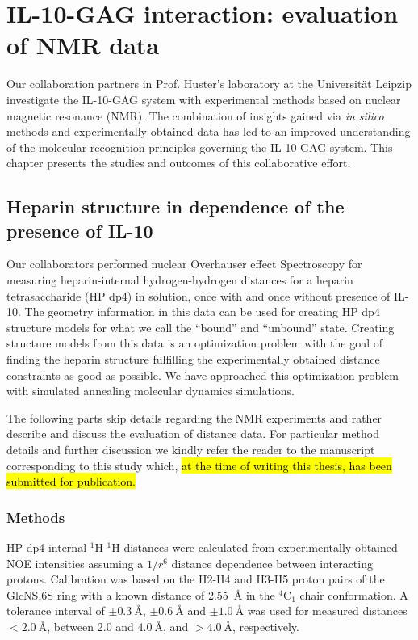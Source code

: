 \chapter{IL-10-GAG interaction: evaluation of NMR data}

Our collaboration partners in Prof. Huster's laboratory at the Universität
Leipzip investigate the IL-10-GAG system with experimental methods based on
nuclear magnetic resonance (NMR). The combination of insights gained via
\textit{in silico} methods and experimentally obtained data has led to an
improved understanding of the molecular recognition principles governing the
IL-10-GAG system. This chapter presents the studies and outcomes of this
collaborative effort.


\section{Heparin structure in dependence of the presence of IL-10}

Our collaborators performed nuclear Overhauser effect Spectroscopy for measuring
heparin-internal hydrogen-hydrogen distances for a heparin tetrasaccharide (HP
dp4) in solution, once with and once without presence of IL-10. The geometry
information in this data can be used for creating HP dp4 structure models for
what we call the \enquote{bound} and \enquote{unbound} state. Creating structure
models from this data is an optimization problem with the goal of finding the
heparin structure fulfilling the experimentally obtained distance constraints as
good as possible. We have approached this optimization problem with simulated
annealing molecular dynamics simulations.

The following parts skip details regarding the NMR experiments and rather
describe and discuss the evaluation of distance data. For particular method
details and further discussion we kindly refer the reader to the manuscript
corresponding to this study which, \hl{at the time of writing this thesis, has
been submitted for publication.}

\subsection{Methods}

HP dp4-internal ${}^1$H-${}^1$H distances were calculated
from experimentally obtained NOE intensities assuming a $1/r^6$ distance
dependence between interacting protons. Calibration was based on the H2-H4 and
H3-H5 proton pairs of the GlcNS,6S ring with a known distance of
\SI{2.55}{\angstrom} in the ${}^4$C${}_1$ chair conformation. A tolerance
interval of $\pm \SI{0.3}{\angstrom}$, $\pm \SI{0.6}{\angstrom}$ and $\pm
\SI{1.0}{\angstrom}$ was used for measured distances $< \SI{2.0}{\angstrom}$,
between \num{2.0} and $\SI{4.0}{\angstrom}$, and $> \SI{4.0}{\angstrom}$,
respectively.

